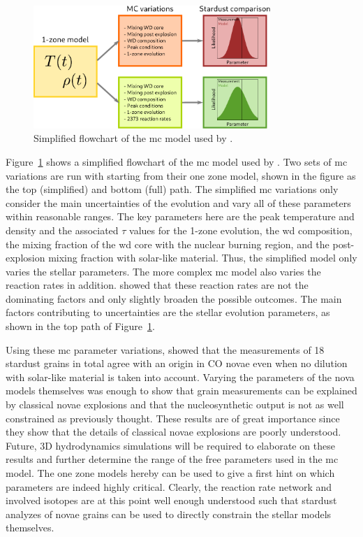 \begin{figure}[tb]
    \centering
    \includegraphics[width=0.8\textwidth]{graphics/novae/mc_model_iliadis_schematic}
    \caption{Simplified flowchart of the \ac{mc} model used by \citet{iliadis18}.}
    \label{fig:novae:mc_model_iliadis_flowchart}
\end{figure}
Figure~\ref{fig:novae:mc_model_iliadis_flowchart} shows a simplified flowchart of the \ac{mc} model used by \citet{iliadis18}. Two sets of \ac{mc} variations are run with starting from their one zone model, shown in the figure as the top (simplified) and bottom (full) path. The simplified \ac{mc} variations only consider the main uncertainties of the evolution and vary all of these parameters within reasonable ranges. The key parameters here are the peak temperature and density and the associated $\tau$ values for the 1-zone evolution, the \ac{wd} composition, the mixing fraction of the \ac{wd} core with the nuclear burning region, and the post-explosion mixing fraction with solar-like material. Thus, the simplified model only varies the stellar parameters. The more complex \ac{mc} model also varies the reaction rates in addition. \citet{iliadis18} showed that these reaction rates are not the dominating factors and only slightly broaden the possible outcomes. The main factors contributing to uncertainties are the stellar evolution parameters, as shown in the top path of Figure~\ref{fig:novae:mc_model_iliadis_flowchart}. 

Using these \ac{mc} parameter variations, \citet{iliadis18} showed that the measurements of 18 stardust grains in total agree with an origin in CO novae even when no dilution with solar-like material is taken into account. Varying the parameters of the nova models themselves was enough to show that grain measurements can be explained by classical novae explosions and that the nucleosynthetic output is not as well constrained as previously thought. These results are of great importance since they show that the details of classical novae explosions are poorly understood. Future, 3D hydrodynamics simulations will be required to elaborate on these results and further determine the range of the free parameters used in the \ac{mc} model. The one zone models hereby can be used to give a first hint on which parameters are indeed highly critical. Clearly, the reaction rate network and involved isotopes are at this point well enough understood such that stardust analyzes of novae grains can be used to directly constrain the stellar models themselves.


